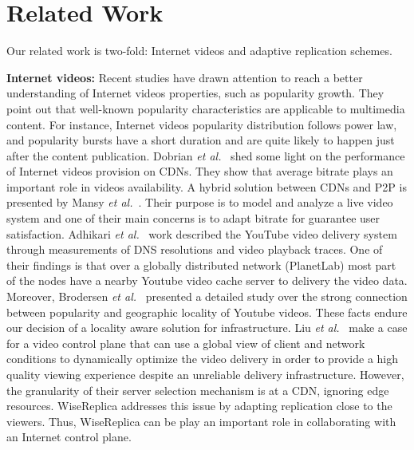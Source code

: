\section{Related Work}
\label{sec:related_work}

Our related work is two-fold: Internet videos and adaptive replication schemes.

\noindent \textbf{Internet videos:} Recent studies
\cite{youtube_wsdm_2011,popularity_prediction_2010} have drawn
attention to reach a better understanding of Internet videos
properties, such as popularity growth. They point out that well-known
popularity characteristics are applicable to multimedia content. For
instance, Internet videos popularity distribution follows power law,
and popularity bursts have a short duration and are quite likely to
happen just after the content publication. Dobrian \emph{et
al.}~\cite{Dobrian_sigcomm_2011} shed some light on the performance of
Internet videos provision on CDNs. They show that average bitrate plays
an important role in videos availability. A hybrid solution between
CDNs and P2P is presented by Mansy \emph{et
al.}~\cite{Mansy_icnp_2011}. Their purpose is to model and analyze a
live video system and one of their main concerns is to adapt bitrate
for guarantee user satisfaction. Adhikari \emph{et
al.}~\cite{Adhikari_infocom_2012} work described the YouTube video
delivery system through measurements of DNS resolutions and video
playback traces. One of their findings is that over a globally
distributed network (PlanetLab) most part of the nodes have a nearby
Youtube video cache server to delivery the video data.  Moreover,
Brodersen \emph{et al.}~\cite{Brodersen_www_2012} presented a detailed
study over the strong connection between popularity and geographic
locality of Youtube videos. These facts endure our decision of a
locality aware solution for infrastructure. Liu \emph{et
al.}~\cite{Liu_sigcomm_2012} make a case for a video control plane
that can use a global view of client and network conditions to
dynamically optimize the video delivery in order to provide a high
quality viewing experience despite an unreliable delivery
infrastructure. However, the granularity of their server selection
mechanism is at a CDN, ignoring edge resources. WiseReplica
addresses this issue by adapting replication close to the viewers.
Thus, WiseReplica can be play an important role in collaborating with an
Internet control plane.


